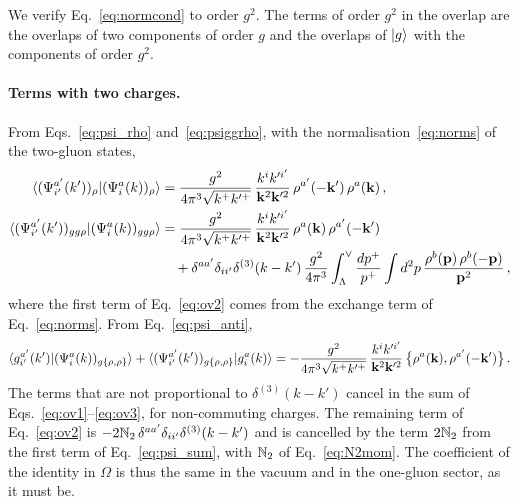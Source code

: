 We verify Eq.~\eqref{eq:normcond} to order $g^2$. The terms of order $g^2$ in the overlap are the overlaps of two components of order $g$ and the overlaps of $\ket g$ with the components of order $g^2$.

\paragraph{Terms with two charges.} From Eqs.~\eqref{eq:psi_rho} and~\eqref{eq:psiggrho}, with the normalisation~\eqref{eq:norms} of the two-gluon states,
\begin{align}
\braket{(\Psi^{a'}_{i'}(k'))_\rho|(\Psi^a_i(k))_\rho}&=\frac{g^2}{4\pi^3\sqrt{k^+k'^+}}\,\frac{k^ik'^{i'}}{\mathbf{k}^2\mathbf{k}'^2}\,\rho^{a'}(-\mathbf{k}')\,\rho^a(\mathbf{k})\,,\label{eq:ov1}\\
\braket{(\Psi^{a'}_{i'}(k'))_{gg\rho}|(\Psi^a_i(k))_{gg\rho}}&=\frac{g^2}{4\pi^3\sqrt{k^+k'^+}}\,\frac{k^ik'^{i'}}{\mathbf{k}^2\mathbf{k}'^2}\,\rho^a(\mathbf{k})\,\rho^{a'}(-\mathbf{k}')\notag\\
&\quad+\delta^{aa'}\delta_{ii'}\delta^{(3)}(k-k')\,\frac{g^2}{4\pi^3}\int_\Lambda^\vee\frac{dp^+}{p^+}\int d^2p\,\frac{\rho^b(\mathbf{p})\,\rho^b(-\mathbf{p})}{\mathbf{p}^2}\,,\label{eq:ov2}
\end{align}
where the first term of Eq.~\eqref{eq:ov2} comes from the exchange term of Eq.~\eqref{eq:norms}. From Eq.~\eqref{eq:psi_anti},
\begin{align}\label{eq:ov3}
\braket{g^{a'}_{i'}(k')|(\Psi^a_i(k))_{g\{\rho,\rho\}}}+\braket{(\Psi^{a'}_{i'}(k'))_{g\{\rho,\rho\}}|g^a_i(k)}=-\frac{g^2}{4\pi^3\sqrt{k^+k'^+}}\,\frac{k^ik'^{i'}}{\mathbf{k}^2\mathbf{k}'^2}\,\big\{\rho^a(\mathbf{k}),\rho^{a'}(-\mathbf{k}')\big\}\,.
\end{align}
The terms that are not proportional to $\delta^{(3)}(k-k')$ cancel in the sum of Eqs.~\eqref{eq:ov1}--\eqref{eq:ov3}, for non-commuting charges. The remaining term of Eq.~\eqref{eq:ov2} is $-2\mathbb{N}_2\,\delta^{aa'}\delta_{ii'}\delta^{(3)}(k-k')$ and is cancelled by the term $2\mathbb{N}_2$ from the first term of Eq.~\eqref{eq:psi_sum}, with $\mathbb{N}_2$ of Eq.~\eqref{eq:N2mom}. The coefficient of the identity in $\Omega$ is thus the same in the vacuum and in the one-gluon sector, as it must be.

